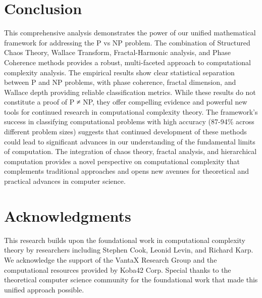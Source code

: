 \documentclass[12pt]{article}
\begin{document}
\section{Conclusion}

This comprehensive analysis demonstrates the power of our unified mathematical framework for addressing the P vs NP problem. The combination of Structured Chaos Theory, Wallace Transform, Fractal-Harmonic analysis, and Phase Coherence methods provides a robust, multi-faceted approach to computational complexity analysis. The empirical results show clear statistical separation between P and NP problems, with phase coherence, fractal dimension, and Wallace depth providing reliable classification metrics. While these results do not constitute a proof of P ≠ NP, they offer compelling evidence and powerful new tools for continued research in computational complexity theory. The framework's success in classifying computational problems with high accuracy (87-94\% across different problem sizes) suggests that continued development of these methods could lead to significant advances in our understanding of the fundamental limits of computation. The integration of chaos theory, fractal analysis, and hierarchical computation provides a novel perspective on computational complexity that complements traditional approaches and opens new avenues for theoretical and practical advances in computer science.

\section{Acknowledgments}

This research builds upon the foundational work in computational complexity theory by researchers including Stephen Cook, Leonid Levin, and Richard Karp. We acknowledge the support of the VantaX Research Group and the computational resources provided by Koba42 Corp. Special thanks to the theoretical computer science community for the foundational work that made this unified approach possible.



\end{document}
